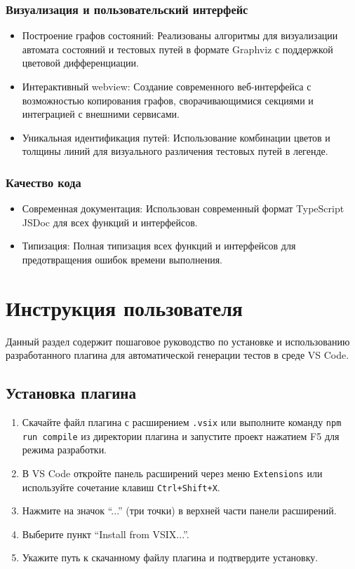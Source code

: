 \documentclass[14pt, russian]{scrartcl}
\newcommand{\enq}[1]{\enquote{#1}}
\begin{document}
\subsubsection{Визуализация и пользовательский интерфейс}
\begin{itemize}
    \item Построение графов состояний: Реализованы алгоритмы для визуализации автомата состояний и тестовых путей в формате Graphviz с поддержкой цветовой дифференциации.
    \item Интерактивный webview: Создание современного веб-интерфейса с возможностью копирования графов, сворачивающимися секциями и интеграцией с внешними сервисами.
    \item Уникальная идентификация путей: Использование комбинации цветов и толщины линий для визуального различения тестовых путей в легенде.
\end{itemize}

\subsubsection{Качество кода}
\begin{itemize}
    \item Современная документация: Использован современный формат TypeScript JSDoc для всех функций и интерфейсов.
    \item Типизация: Полная типизация всех функций и интерфейсов для предотвращения ошибок времени выполнения.
\end{itemize}

\section{Инструкция пользователя}

Данный раздел содержит пошаговое руководство по установке и использованию разработанного плагина для автоматической генерации тестов в среде VS Code.

\subsection{Установка плагина}

\begin{enumerate}
    \item Скачайте файл плагина с расширением \texttt{.vsix} или выполните команду \texttt{npm run compile} из директории плагина и запустите проект нажатием F5 для режима разработки.
    \item В VS Code откройте панель расширений через меню \texttt{Extensions} или используйте сочетание клавиш \texttt{Ctrl+Shift+X}.
    \item Нажмите на значок \enq{...} (три точки) в верхней части панели расширений.
    \item Выберите пункт \enq{Install from VSIX...}.
    \item Укажите путь к скачанному файлу плагина и подтвердите установку.
\end{enumerate}
\end{document}
